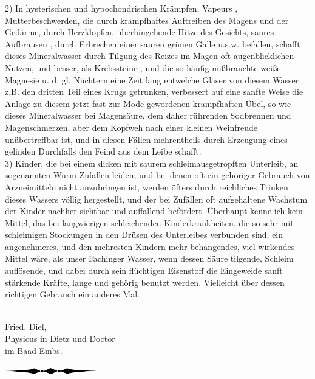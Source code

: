 \documentclass[11pt,a5paper,twoside]{memoir}
\begin{document}
2) In hysterischen und hypochondrischen Krämpfen, Vapeurs%
,
Mutterbeschwerden,
die durch krampfhaftes Auftreiben des Magens und der Gedärme,
durch Herzklopfen, überhingehende Hitze des Gesichts,
saures Aufbrausen%
,
durch Erbrechen einer sauren grünen Galle u.s.w. befallen,
schafft dieses Mineralwasser
durch Tilgung des Reizes im Magen oft  augenblicklichen Nutzen,
und besser, als Krebssteine%
,
und die so häufig mißbrauchte weiße Magnesie%
u. d. gl. Nüchtern eine Zeit lang entwelche Gläser von diesem Wasser,
z.B. den dritten Teil eines Krugs getrunken,
verbessert auf eine sanfte Weise die Anlage
zu diesem jetzt fast zur Mode gewordenen krampfhaften Übel,
so wie dieses Mineralwasser bei Magensäure,
dem daher rührenden Sodbrennen und Magenschmerzen,
aber dem Kopfweh nach einer kleinen Weinfreude unübertreffbar ist,
und in diesen Fällen mehrentheils
durch Erzeugung eines gelinden Durchfalls
den Feind aus dem Leibe schafft.\\

3) Kinder, die bei einem dicken mit saurem schleimausgetropften Unterleib,
an sogenannten Wurm-Zufällen leiden,
und bei denen oft ein gehöriger Gebrauch
von  Arzneimitteln nicht anzubringen ist,
werden öfters durch reichliches Trinken dieses Wassers völlig hergestellt,
und der bei Zufällen oft aufgehaltene Wachstum der Kinder
nachher sichtbar und auffallend befördert.
Überhaupt kenne ich kein Mittel,
das bei langwierigen schleichenden Kinderkrankheiten,
die so sehr mit schleimigen Stockungen
in den Drüsen des Unterleibes verbunden sind,
ein angenehmeres, und den mehresten Kindern mehr behangendes,
viel wirkendes Mittel wäre,
als unser Fachinger Wasser,
wenn dessen Säure tilgende, Schleim auflösende,
und dabei durch sein flüchtigen Eisenstoff
die Eingeweide sanft stärkende Kräfte,
lange und gehörig benutzt werden.
Vielleicht über dessen richtigen Gebrauch ein anderes Mal.\\
\\

\hfill
\begin{minipage}{6cm}
  \centering
{\Large Fried. Diel,}\\
Physicus in Dietz und Doctor\\
im Baad Embs.
\end{minipage}

\vfill
\begin{center}
\includegraphics[width=4cm]{../figures/div2}
\end{center}
\vfill%
%
\checkoddpage\ifoddpage
  \newpage\strut
  \fancyhead[C]{}\fi
\end{document}
